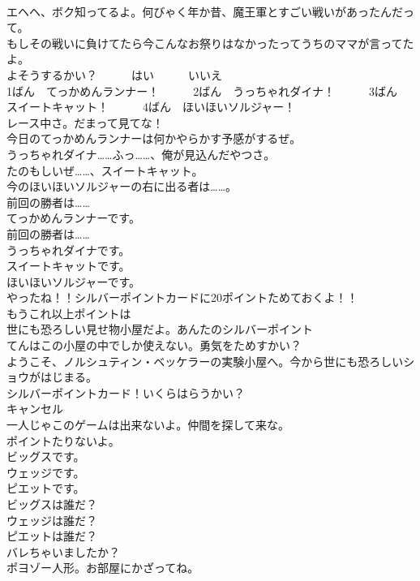 \documentclass[8pt]{extreport}
\begin{document}
\begin{CJK}{UTF8}{min}
\\	エヘヘ、ボク知ってるよ。何びゃく年か昔、魔王軍とすごい戦いがあったんだって。	
\\	もしその戦いに負けてたら今こんなお祭りはなかったってうちのママが言ってたよ。	
\\	よそうするかい？　　　はい　　　いいえ	
\\	1ばん　てっかめんランナー！　　　2ばん　うっちゃれダイナ！　　　3ばん　スイートキャット！　　　4ばん　ほいほいソルジャー！	
\\	レース中さ。だまって見てな！	
\\	今日のてっかめんランナーは何かやらかす予感がするぜ。	
\\	うっちゃれダイナ……ふっ……、俺が見込んだやつさ。	
\\	たのもしいぜ……、スイートキャット。	
\\	今のほいほいソルジャーの右に出る者は……。	
\\	前回の勝者は……	
\\	てっかめんランナーです。	
\\	前回の勝者は……	
\\	うっちゃれダイナです。	
\\	スイートキャットです。	
\\	ほいほいソルジャーです。	
\\	やったね！！シルバーポイントカードに20ポイントためておくよ！！	
\\	もうこれ以上ポイントは	
\\	世にも恐ろしい見せ物小屋だよ。あんたのシルバーポイント
\\	てんはこの小屋の中でしか使えない。勇気をためすかい？	
\\	ようこそ、ノルシュティン・ベッケラーの実験小屋へ。今から世にも恐ろしいショウがはじまる。	
\\	シルバーポイントカード！いくらはらうかい？	
\\	キャンセル	
\\	一人じゃこのゲームは出来ないよ。仲間を探して来な。	
\\	ポイントたりないよ。	
\\	ビッグスです。	
\\	ウェッジです。	
\\	ピエットです。	
\\	ビッグスは誰だ？	
\\	ウェッジは誰だ？	
\\	ピエットは誰だ？	
\\	バレちゃいましたか？	
\\	ポヨゾー人形。お部屋にかざってね。	

\end{CJK}
\end{document}
